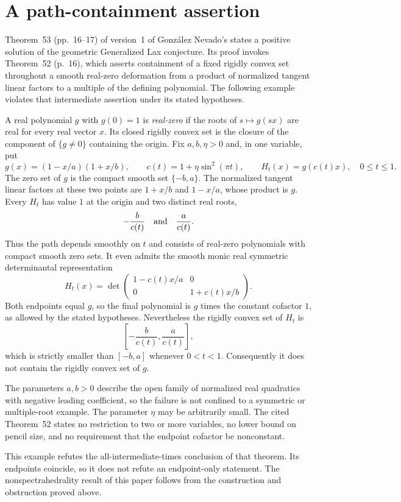 \section{A path-containment assertion}
\label{app:opposition}

Theorem~53 (pp.~16--17) of version~1 of Gonz\'alez Nevado's
\cite{gonzalez-nevado-2026} states a positive solution of the geometric
Generalized Lax conjecture. Its proof invokes Theorem~52 (p.~16), which asserts
containment of a fixed rigidly convex set throughout a smooth real-zero
deformation from a product of normalized tangent linear factors to a
multiple of the defining polynomial. The following example violates
that intermediate assertion under its stated hypotheses.

A real polynomial $g$ with $g(0)=1$ is \emph{real-zero} if the roots of
$s\mapsto g(sx)$ are real for every real vector $x$. Its closed
rigidly convex set is the closure of the component of $\{g\ne0\}$
containing the origin. Fix $a,b,\eta>0$ and, in one variable, put
\[
 g(x)=(1-x/a)(1+x/b),\qquad
 c(t)=1+\eta\sin^2(\pi t),\qquad
 H_t(x)=g(c(t)x),\quad 0\le t\le1.
\]
The zero set of $g$ is the compact smooth set $\{-b,a\}$.
The normalized tangent linear factors at these two points are
$1+x/b$ and $1-x/a$, whose product is $g$. Every $H_t$ has value $1$
at the origin and two distinct real roots,
\[
 -\frac{b}{c(t)}\quad\hbox{and}\quad\frac{a}{c(t)}.
\]
Thus the path depends smoothly on $t$ and consists of real-zero
polynomials with compact smooth zero sets. It even admits the smooth
monic real symmetric determinantal representation
\[
 H_t(x)=\det\begin{pmatrix}
 1-c(t)x/a&0\\
 0&1+c(t)x/b
 \end{pmatrix}.
\]
Both endpoints equal $g$, so the final polynomial is $g$ times the
constant cofactor $1$, as allowed by the stated hypotheses.
Nevertheless the rigidly convex set of $H_t$ is
\[
 \left[-\frac{b}{c(t)},\frac{a}{c(t)}\right],
\]
which is strictly smaller than $[-b,a]$ whenever $0<t<1$.
Consequently it does not contain the rigidly convex set of $g$.

The parameters $a,b>0$ describe the open family of normalized real
quadratics with negative leading coefficient, so the failure is not
confined to a symmetric or multiple-root example. The parameter $\eta$
may be arbitrarily small. The cited Theorem~52 states no restriction
to two or more variables, no lower bound on pencil size, and no
requirement that the endpoint cofactor be nonconstant.

This example refutes the all-intermediate-times conclusion of that
theorem. Its endpoints coincide, so it does not refute an endpoint-only
statement. The nonspectrahedrality result of this paper follows from
the construction and obstruction proved above.

